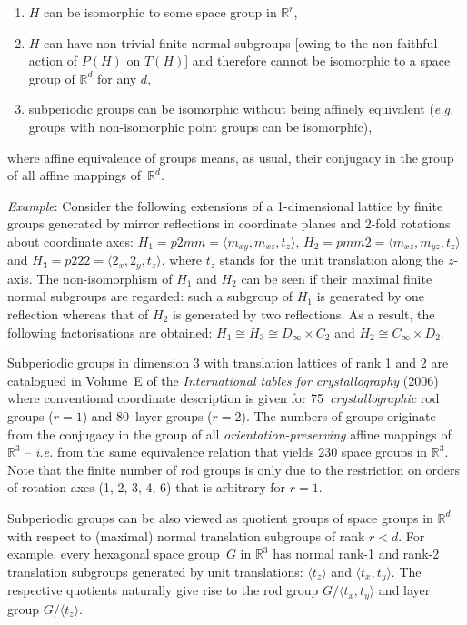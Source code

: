 \documentclass[11pt,a4paper]{article}
\newcommand{\R}{\mathbb R}
\begin{document}
\begin{enumerate}
\setlength\itemsep{-0.02in}
\item[(a)] $H$ can be isomorphic to some space group in $\R^r$,
\item[(b)] $H$ can have non-trivial finite normal subgroups [owing to the non-faithful action of $P(H)$ on $T(H)$] and therefore cannot be isomorphic to a space group of $\R^d$ for any $d$,
\item[(c)] subperiodic groups can be isomorphic without being affinely equivalent (\emph{e.g.} groups with non-isomorphic point groups can be isomorphic),
\end{enumerate}

\noindent where affine equivalence of groups means, as usual, their conjugacy in the group of all affine mappings of~$\R^d$.

\medskip

\noindent \emph{Example}: Consider the following extensions of a 1-dimensional lattice by finite groups generated by mirror reflections in coordinate planes and 2-fold rotations about coordinate axes: $H_1 = p2mm = \langle m_{xy}, m_{xz}, t_z \rangle$, $H_2 = pmm2 = \langle m_{xz}, m_{yz}, t_z \rangle$ and $H_3 = p222 = \langle 2_{x}, 2_{y}, t_z \rangle$, where $t_z$  stands for the unit translation along the $z$-axis. The non-isomorphism of $H_1$ and $H_2$ can be seen if their maximal finite normal subgroups are regarded: such a subgroup of $H_1$ is generated by one reflection whereas that of $H_2$ is generated by two reflections. As a result, the following factorisations are obtained: $H_1 \cong H_3 \cong D_{\infty} \times C_{2}$ and $H_2 \cong C_{\infty} \times D_{2}$.


\medskip


Subperiodic groups in dimension 3 with translation lattices of rank 1 and 2 are catalogued in Volume~E of the \emph{International tables for crystallography} (2006) where conventional coordinate description is given for 75~\emph{crystallographic} rod groups ($r=1$) and 80~layer groups ($r=2$). The numbers of groups originate from the conjugacy in the group of all \emph{orientation-preserving} affine mappings of $\R^3$ -- \emph {i.e.} from the same equivalence relation that yields 230 space groups in $\R^3$. Note that the finite number of rod groups is only due to the restriction on orders of rotation axes (1, 2, 3, 4, 6) that is arbitrary for $r=1$.

Subperiodic groups can be also viewed as quotient groups of space groups in $\R^d$ with respect to (maximal) normal translation subgroups of rank $r < d$. For example, every hexagonal space group~$G$ in $\R^3$ has normal rank-1 and rank-2 translation subgroups generated by unit translations: $\langle t_z \rangle$ and $\langle t_x, t_y \rangle$. The respective quotients naturally give rise to the rod group $G/\langle t_x, t_y \rangle$ and layer group $G/\langle t_z \rangle$. 
\end{document}
